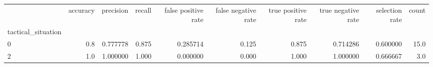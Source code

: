 \begin{tabular}{lrrrrrrrrr}
\toprule
{} &  accuracy &  precision &  recall &  false positive rate &  false negative rate &  true positive rate &  true negative rate &  selection rate &  count \\
tactical\_situation &           &            &         &                      &                      &                     &                     &                 &        \\
\midrule
0                  &       0.8 &   0.777778 &   0.875 &             0.285714 &                0.125 &               0.875 &            0.714286 &        0.600000 &   15.0 \\
2                  &       1.0 &   1.000000 &   1.000 &             0.000000 &                0.000 &               1.000 &            1.000000 &        0.666667 &    3.0 \\
\bottomrule
\end{tabular}
